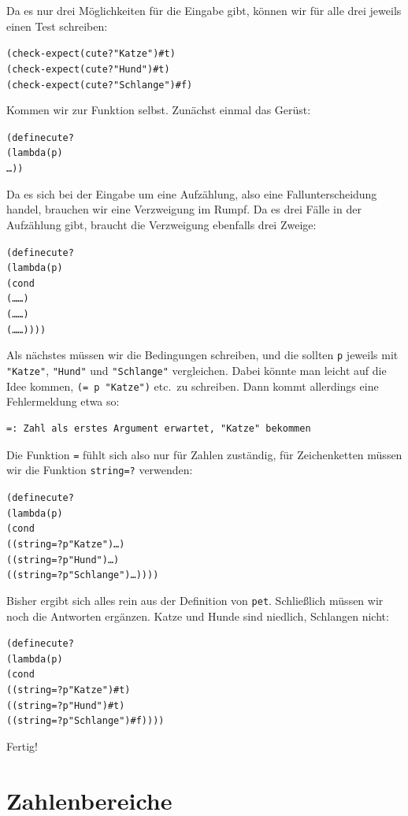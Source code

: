 Da es nur drei Möglichkeiten für die Eingabe gibt, können wir für alle
drei jeweils einen Test schreiben:
%
\begin{alltt}
(check-expect (cute? "Katze") #t)
(check-expect (cute? "Hund") #t)
(check-expect (cute? "Schlange") #f)
\end{alltt}
%
Kommen wir zur Funktion selbst.  Zunächst einmal das Gerüst:
%
\begin{alltt}
(define cute?
  (lambda (p)
    \ldots))
\end{alltt}
%
Da es sich bei der Eingabe um eine Aufzählung, also eine
Fallunterscheidung handel, brauchen wir eine Verzweigung im Rumpf.  Da
es drei Fälle in der Aufzählung gibt, braucht die Verzweigung
ebenfalls drei Zweige:
%
\begin{alltt}
(define cute?
  (lambda (p)
    (cond
      (\ldots{} \ldots)
      (\ldots{} \ldots)
      (\ldots{} \ldots))))
\end{alltt}
%
Als nächstes müssen wir die Bedingungen schreiben, und die sollten
\texttt{p} jeweils mit \verb|"Katze"|, \verb|"Hund"| und
\verb|"Schlange"| vergleichen.  Dabei könnte man leicht auf die Idee
kommen, \verb|(= p "Katze")| etc.\ zu schreiben.  Dann kommt
allerdings eine Fehlermeldung etwa so:
%
\begin{verbatim}
=: Zahl als erstes Argument erwartet, "Katze" bekommen
\end{verbatim}
%
Die Funktion \texttt{=} fühlt sich also nur für Zahlen zuständig, für
Zeichenketten müssen wir die Funktion
\texttt{string=?} verwenden:
%
\begin{alltt}
(define cute?
  (lambda (p)
    (cond
      ((string=? p "Katze") \ldots)
      ((string=? p "Hund") \ldots)
      ((string=? p "Schlange") \ldots))))
\end{alltt}
%
Bisher ergibt sich alles rein aus der Definition von \texttt{pet}.
Schließlich müssen wir noch die Antworten ergänzen.  Katze und Hunde
sind niedlich, Schlangen nicht:
%
\begin{alltt}
(define cute?
  (lambda (p)
    (cond
      ((string=? p "Katze") #t)
      ((string=? p "Hund") #t)
      ((string=? p "Schlange") #f))))
\end{alltt}
%
Fertig!

\section{Zahlenbereiche}
\label{sec:zahlenbereiche}
\label{sec:heat-water}

